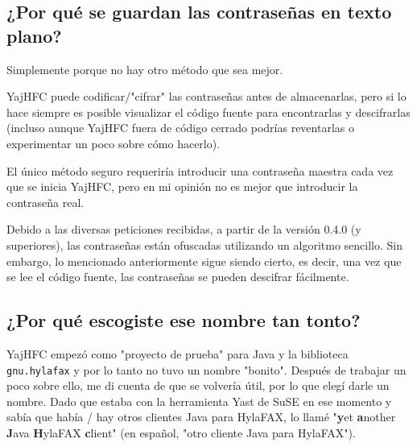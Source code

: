 \documentclass[a4paper,10pt]{scrartcl}
\begin{document}
\subsection{¿Por qué se guardan las contraseñas en texto plano?}

Simplemente porque no hay otro método que sea mejor.


YajHFC puede codificar/"cifrar" las contraseñas antes de almacenarlas, 
pero si lo hace siempre es posible visualizar el código fuente para encontrarlas 
y descifrarlas (incluso aunque YajHFC fuera de código cerrado podrías reventarlas o experimentar un poco sobre cómo hacerlo).


El único método seguro requeriría introducir una contraseña maestra cada vez que se inicia YajHFC, pero en mi opinión no es mejor que introducir la contraseña real.

Debido a las diversas peticiones recibidas, a partir de la versión 0.4.0 (y superiores), las contraseñas están ofuscadas utilizando un algoritmo sencillo.
Sin embargo, lo mencionado anteriormente sigue siendo cierto, es decir, una vez que se lee el código fuente, las contraseñas se pueden descifrar fácilmente.

\subsection{¿Por qué escogiste ese nombre tan tonto?}

YajHFC empezó como "proyecto de prueba" para Java y la biblioteca \texttt{gnu.hylafax}
y por lo tanto no tuvo un nombre "bonito". Después de trabajar un poco sobre ello, me di cuenta de que se volvería útil, por lo que elegí darle un nombre.
Dado que estaba con la herramienta Yast de SuSE en ese momento y sabía 
que había / hay otros clientes Java para HylaFAX, lo llamé "\textbf{y}et \textbf{a}nother \textbf{J}ava \textbf{H}ylaFAX \textbf{c}lient" (en español, "otro cliente Java para HylaFAX").
 
\end{document}
